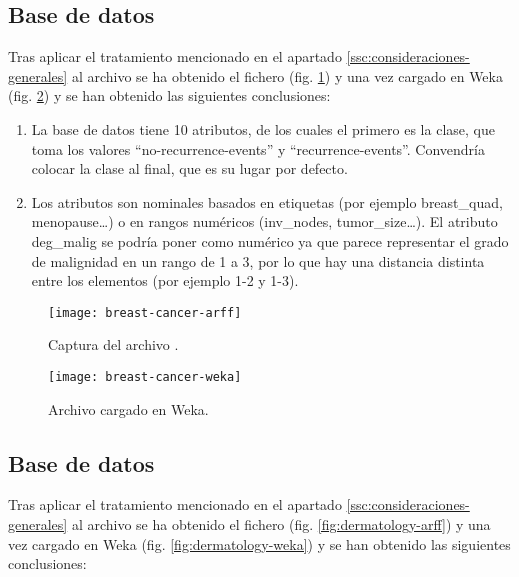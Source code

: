 \subsection{Base de datos }
Tras aplicar el tratamiento mencionado en el apartado \ref{ssc:consideraciones-generales} al archivo  se ha obtenido el fichero  (fig. \ref{fig:breast-cancer-arff}) y una vez cargado en Weka (fig. \ref{fig:breast-cancer-weka}) y se han obtenido las siguientes conclusiones:

\begin{enumerate}
    \item La base de datos tiene 10 atributos, de los cuales el primero es la clase, que toma los valores ``no-recurrence-events'' y ``recurrence-events''. Convendría colocar la clase al final, que es su lugar por defecto.
    \item Los atributos son nominales basados en etiquetas (por ejemplo breast\_quad, menopause\dots) o en rangos numéricos (inv\_nodes, tumor\_size\dots). El atributo deg\_malig se podría poner como numérico ya que parece representar el grado de malignidad en un rango de 1 a 3, por lo que hay una distancia distinta entre los elementos (por ejemplo 1-2 y 1-3).
\end{enumerate}
\begin{figure}[ht]
    \centering
    \texttt{[image: breast-cancer-arff]}
    \caption{Captura del archivo .}
    \label{fig:breast-cancer-arff}
\end{figure}
\begin{figure}[ht]
    \centering
    \texttt{[image: breast-cancer-weka]}
    \caption{Archivo  cargado en Weka.}
    \label{fig:breast-cancer-weka}
\end{figure}

\subsection{Base de datos }
Tras aplicar el tratamiento mencionado en el apartado \ref{ssc:consideraciones-generales} al archivo  se ha obtenido el fichero  (fig. \ref{fig:dermatology-arff}) y una vez cargado en Weka (fig. \ref{fig:dermatology-weka}) y se han obtenido las siguientes conclusiones:

